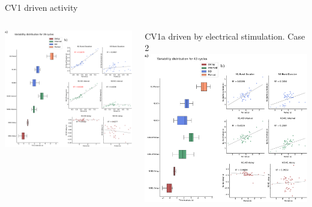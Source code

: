 \documentclass[aspectratio=43]{beamer}
\begin{document}
\begin{frame}{CV1 driven activity}
{\begin{columns}
\begin{column}{0.6\textwidth}
				\includegraphics[width=\textwidth]{invariants/data/SUSSEX/CV1a_driven1/images/2phases/panel_with_intervals_boxplot_invariants.pdf}
			\end{column}
			\begin{column}{0.6\textwidth}
				\centering CV1a driven by electrical stimulation. Case 2
				\includegraphics[width=\textwidth]{invariants/data/SUSSEX/CV1a_driven2/images/panel_with_intervals_boxplot_invariants.pdf}
			\end{column}
		\end{columns}
	}
\end{frame}
\end{document}
